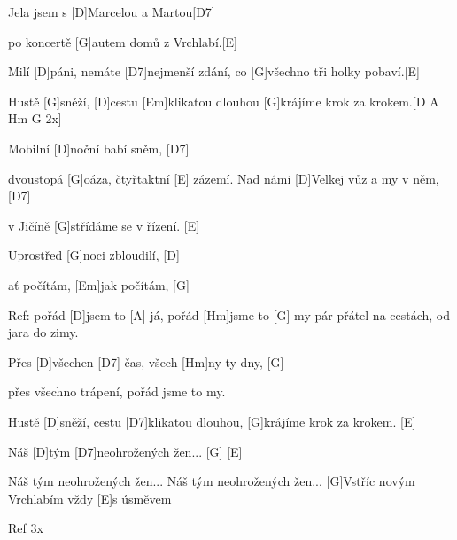 
Jela jsem s [D]Marcelou a Martou[D7]

po koncertě [G]autem domů z Vrchlabí.[E]

Milí [D]páni, nemáte [D7]nejmenší zdání,
co [G]všechno tři holky pobaví.[E]


Hustě [G]sněží, [D]cestu [Em]klikatou dlouhou
[G]krájíme krok za krokem.[D A Hm G 2x]

Mobilní [D]noční babí sněm, [D7]

dvoustopá [G]oáza, čtyřtaktní [E] zázemí.
Nad námi [D]Velkej vůz a my v něm, [D7]

v Jičíně [G]střídáme se v řízení. [E]


Uprostřed [G]noci zbloudilí, [D]

ať počítám, [Em]jak počítám, [G]

\slpc
Ref: pořád [D]jsem to [A] já,
pořád [Hm]jsme to [G] my
pár přátel na cestách,
od jara do zimy.

Přes [D]všechen [D7] čas,
všech [Hm]ny ty dny, [G]

přes všechno trápení,
pořád jsme to my.

Hustě [D]sněží, cestu [D7]klikatou dlouhou,
[G]krájíme krok za krokem. [E]

Náš [D]tým [D7]neohrožených žen... [G] [E]

Náš tým neohrožených žen...
Náš tým neohrožených žen...
[G]Vstříc novým Vrchlabím
vždy [E]s úsměvem

Ref 3x





